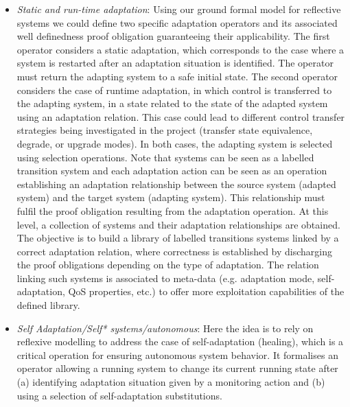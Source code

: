\documentclass[a4paper,11pt]{article}
\begin{document}
\begin{itemize}
\item \emph{Static and run-time adaptation}: Using our ground formal model for reflective systems we could define two specific adaptation operators and its associated well definedness proof obligation guaranteeing their applicability. The first operator considers a static adaptation, which corresponds to the case where a system is restarted after an adaptation situation is identified. The operator must return the adapting system to a safe initial state. The second operator considers the case of runtime adaptation, in which control is transferred to the adapting system, in a state related to the state of the adapted system using an adaptation relation. This case could lead to different control transfer strategies being investigated in the project (transfer state equivalence, degrade, or upgrade modes). In both cases, the adapting system is selected using selection operations. Note that systems can be seen as a labelled transition system and each adaptation action can be seen as an operation establishing an adaptation relationship between the source  system  (adapted  system) and  the  target  system  (adapting  system).  This  relationship  must  fulfil  the  proof obligation resulting from the adaptation operation. At this level, a collection of systems and their adaptation relationships are obtained. The objective is to build a library of labelled transitions systems linked by a correct adaptation relation, where correctness is established by discharging the proof obligations  depending on the type of adaptation.  The relation linking such systems is associated to meta-data (e.g.  adaptation mode, self-adaptation,  QoS properties, etc.)  to offer more exploitation capabilities of the defined library.

\item \emph{Self Adaptation/Self* systems/autonomous}: Here the idea is to rely on reflexive modelling to address the case of self-adaptation (healing), which is a critical operation for ensuring autonomous system behavior. It formalises an operator allowing a running system to change its  current running state after (a) identifying adaptation situation given by a monitoring action and (b) using a selection of self-adaptation substitutions.



\end{itemize}
\end{document}
